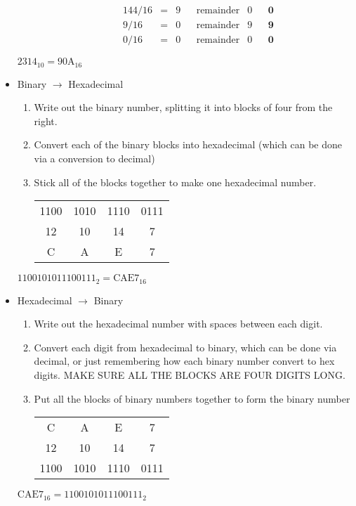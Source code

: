 \begin{itemize}
\begin{enumerate}
\begin{align*}
          & 144/16 & = & 9 & & \textrm{remainder} & 0 & & \textbf{0}\\
          & 9/16 & = & 0 & & \textrm{remainder} & 9 & & \textbf{9}\\
          & 0/16 & = & 0 & & \textrm{remainder} & 0 & & \textbf{0}
        \end{align*}
      \end{enumerate}
      \subitem $ 2314_{10} = 90\text{A}_{16} $
    \item Binary $ \to $ Hexadecimal
      \begin{enumerate}
        \item Write out the binary number, splitting it into blocks of four from the right.
        \item Convert each of the binary blocks into hexadecimal (which can be done via a conversion to decimal)
        \item Stick all of the blocks together to make one hexadecimal number.
        \begin{table}[H]
          \centering
          \begin{tabular}{ c c c c }
            1100 & 1010 & 1110 & 0111 \\
            12 & 10 & 14 & 7 \\
            C & A & E & 7
          \end{tabular}
        \end{table}
      \end{enumerate}
      \subitem $ 1100101011100111_2 = \text{CAE}7_{16} $
    \item Hexadecimal $ \to $ Binary
      \begin{enumerate}
        \setlength{\itemsep}{0em}
        \item Write out the hexadecimal number with spaces between each digit.
        \item Convert each digit from hexadecimal to binary, which can be done via decimal, or just remembering how each binary number convert to hex digits. MAKE SURE ALL THE BLOCKS ARE FOUR DIGITS LONG.
        \item Put all the blocks of binary numbers together to form the binary number
        \begin{table}[H]
          \centering
          \begin{tabular}{ c c c c }
            C & A & E & 7 \\
            12 & 10 & 14 & 7 \\
            1100 & 1010 & 1110 & 0111
          \end{tabular}
        \end{table}
      \end{enumerate}
      \subitem $ \text{CAE}7_{16} = 1100101011100111_2 $
  \end{itemize}
